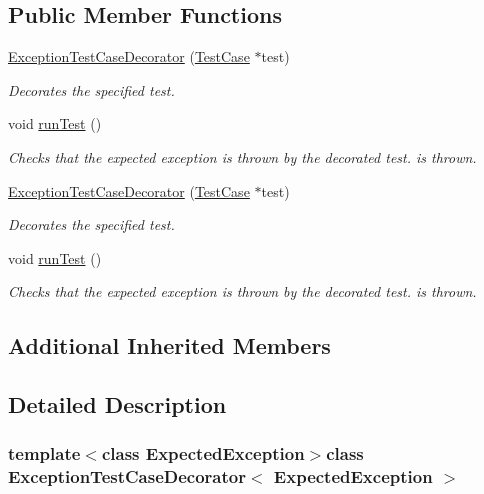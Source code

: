 \subsection*{Public Member Functions}
\begin{DoxyCompactItemize}
\item 
\hyperlink{class_exception_test_case_decorator_a01b0c42952450cff574dd9e293c718fa}{Exception\+Test\+Case\+Decorator} (\hyperlink{class_test_case}{Test\+Case} $\ast$test)
\begin{DoxyCompactList}\small\item\em Decorates the specified test. \end{DoxyCompactList}\item 
void \hyperlink{class_exception_test_case_decorator_a3f78294d459a94f55413162d814f291d}{run\+Test} ()
\begin{DoxyCompactList}\small\item\em Checks that the expected exception is thrown by the decorated test. is thrown. \end{DoxyCompactList}\item 
\hyperlink{class_exception_test_case_decorator_a01b0c42952450cff574dd9e293c718fa}{Exception\+Test\+Case\+Decorator} (\hyperlink{class_test_case}{Test\+Case} $\ast$test)
\begin{DoxyCompactList}\small\item\em Decorates the specified test. \end{DoxyCompactList}\item 
void \hyperlink{class_exception_test_case_decorator_a3f78294d459a94f55413162d814f291d}{run\+Test} ()
\begin{DoxyCompactList}\small\item\em Checks that the expected exception is thrown by the decorated test. is thrown. \end{DoxyCompactList}\end{DoxyCompactItemize}
\subsection*{Additional Inherited Members}


\subsection{Detailed Description}
\subsubsection*{template$<$class Expected\+Exception$>$class Exception\+Test\+Case\+Decorator$<$ Expected\+Exception $>$}

